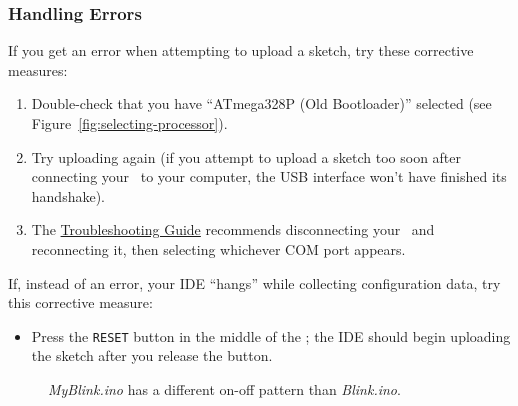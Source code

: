     \subsubsection*{Handling Errors}

        If you get an error when attempting to upload a sketch, try these corrective measures:

        \begin{enumerate}
            \item Double-check that you have ``ATmega328P (Old Bootloader)'' selected (see Figure~\ref{fig:selecting-processor}).
            \item Try uploading again (if you attempt to upload a sketch too soon after connecting your \developmentboard\ to your computer, the USB interface won't have finished its handshake).
            \item The \href{https://support.arduino.cc/hc/en-us/articles/4401874331410--Error-avrdude-when-uploading}{Troubleshooting Guide} recommends disconnecting your \developmentboard\ and reconnecting it, then selecting whichever COM port appears.
        \end{enumerate}

        If, instead of an error, your IDE ``hangs'' while collecting configuration data, try this corrective measure:

        \begin{itemize}
        \item Press the \texttt{RESET} button in the middle of the \developmentboard; the IDE should begin uploading the sketch after you release the button.
        \end{itemize}

    \begin{figure}
        \centering
        \caption{\textit{MyBlink.ino} has a different on-off pattern than \textit{Blink.ino}.\label{fig:myblink}}
    \end{figure}

